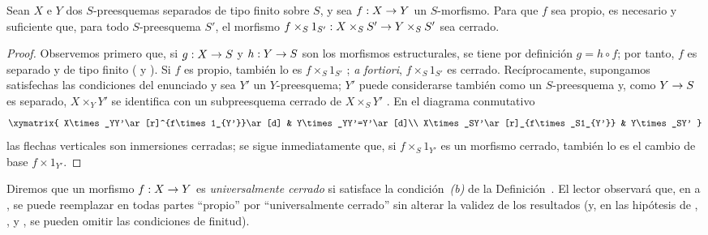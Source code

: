 \documentclass[oneside,10pt]{amsart}
\makeatletter
\newcommand{\ega@arrow}[2]{\mathchoice{#1}{#2}{#2}{#2}}
\renewcommand{\to}{\ega@arrow{\longrightarrow}{\rightarrow}}
\newcommand{\oldpage}[2][]{\marginnote{\normalfont\footnotesize\textbf{#1}~|~#2}\ignorespaces}
\let\EGAOriginalLabel\label
\renewcommand{\label}[1]{\phantomsection\EGAOriginalLabel{#1}}
\makeatother
\begin{document}
\begin{corollary}[5.4.8]
\label{II.5.4.8-fr}
Sean $X$ e $Y$ dos $S$-preesquemas separados de tipo finito sobre $S$, y sea $f:X\to Y$ un $S$-morfismo.
Para que $f$ sea propio, es necesario y suficiente que, para todo $S$-preesquema $S'$, el morfismo $f\times_S1_{S'}:X\times_SS'\to Y\times_SS'$ sea cerrado.
\end{corollary}

\begin{proof}
Observemos primero que, si $g:X\to S$ y $h:Y\to S$ son los morfismos estructurales, se tiene por definición $g=h\circ f$; por tanto, $f$ es separado y de tipo finito ( y ).
Si $f$ es propio, también lo es $f\times_S1_{S'}$ ; \emph{a fortiori}, $f\times_S1_{S'}$ es cerrado.
Recíprocamente, supongamos satisfechas las condiciones del enunciado y sea $Y'$ un $Y$-preesquema;
$Y'$ puede considerarse también como un $S$-preesquema y, como $Y\to S$ es separado, $X\times_YY'$ se identifica con un subpreesquema cerrado de $X\times_SY'$ .
En el diagrama conmutativo
\[
  \xymatrix{
    X\times_YY'\ar[r]^{f\times1_{Y'}}\ar[d] &
    Y\times_YY'=Y'\ar[d]\\
    X\times_SY'\ar[r]_{f\times_S1_{Y'}} & Y\times_SY'
  }
\]
las flechas verticales son inmersiones cerradas; se sigue inmediatamente que, si $f\times_S1_{Y'}$ es un morfismo cerrado, también lo es el cambio de base $f\times1_{Y'}$.
\end{proof}

\begin{remark}[5.4.9]
\label{II.5.4.9-fr}
Diremos que un morfismo $f:X\to Y$ es \emph{universalmente cerrado} si satisface la condición~\emph{(b)} de la Definición~.
El lector observará que,
\oldpage[II]{103}
en  a , se puede reemplazar en todas partes ``propio'' por ``universalmente cerrado'' sin alterar la validez de los resultados (y, en las hipótesis de , ,  y , se pueden omitir las condiciones de finitud).
\end{remark}
\end{document}
